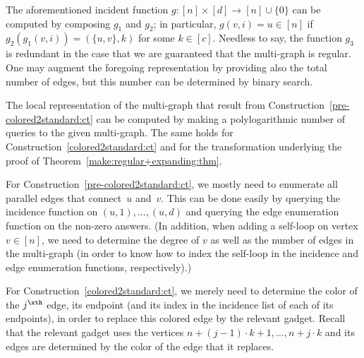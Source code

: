 The aforementioned incident function $g:[n]\times[d]\to[n]\cup\{0\}$
can be computed by composing $g_1$ and $g_2$;
in particular, $g(v,i)=u\in[n]$ if $g_2(g_1(v,i))=(\{u,v\},k)$
for some $k\in[c]$.
Needless to say, the function $g_3$ is redundant in the case
that we are guaranteed that the multi-graph is regular.
%
%
One may augment the foregoing representation by providing also
the total number of edges, but this number can be determined
by binary search.
%

\label{local-computability:thm}
The local representation of the multi-graph that
result from Construction~\ref{pre-colored2standard:ct}
can be computed by making a polylogarithmic number of queries
to the given multi-graph.
The same holds for Construction~\ref{colored2standard:ct}
and for the transformation underlying
the proof of Theorem~\ref{make:regular+expanding:thm}.
\ET

\BPF
For Construction~\ref{pre-colored2standard:ct},
we mostly need to enumerate all parallel edges
that connect~$u$ and~$v$. This can be done easily
by querying the incidence function on $(u,1),\ldots,(u,d)$
and querying the edge enumeration function on the non-zero answers.
(In addition, when adding a self-loop on vertex $v\in[n]$,
we need to determine the degree of $v$
as well as the number of edges in the multi-graph
(in order to know how to index the self-loop
in the incidence and edge enumeration functions, respectively).)

For Construction~\ref{colored2standard:ct},
we merely need to determine the color of the $j^\xth$ edge,
its endpoint
(and its index in the incidence list of each of its endpoints),
in order to replace this colored edge by the relevant gadget.
Recall that the relevant gadget
uses the vertices $n+(j-1)\cdot k+1,\ldots,n+j\cdot k$
and its edges are determined by the color of the edge that it replaces.

